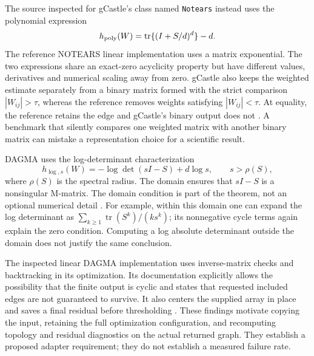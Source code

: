 The source inspected for gCastle's class named \texttt{Notears} instead uses
the polynomial expression
\begin{equation}
 h_{\rm poly}(W)=\operatorname{tr}\{(I+S/d)^d\}-d.
\end{equation}
The reference NOTEARS linear implementation uses a matrix exponential. The
two expressions share an exact-zero acyclicity property but have different
values, derivatives and numerical scaling away from zero. gCastle also keeps
the weighted estimate separately from a binary matrix formed with the strict
comparison \(|W_{ij}|>\tau\), whereas the reference removes weights satisfying
\(|W_{ij}|<\tau\). At equality, the reference retains the edge and gCastle's
binary output does not \citep{exec13_pydisc_gcastle,exec13_pydisc_notears}.
A benchmark that silently compares one weighted matrix with another binary
matrix can mistake a representation choice for a scientific result.

DAGMA uses the log-determinant characterization
\begin{equation}
 h_{\log,s}(W)=-\log\det(sI-S)+d\log s,
 \qquad s>\rho(S),
\end{equation}
where \(\rho(S)\) is the spectral radius. The domain ensures that \(sI-S\) is
a nonsingular M-matrix. The domain condition is part of the theorem, not an
optional numerical detail \citep{exec13_pydisc_dagma2022}. For example, within
this domain one can expand the log determinant as
\(\sum_{k\geq1}\operatorname{tr}(S^k)/(k s^k)\); its nonnegative cycle terms
again explain the zero condition. Computing a log absolute determinant outside
the domain does not justify the same conclusion.

The inspected linear DAGMA implementation uses inverse-matrix checks and
backtracking in its optimization. Its documentation explicitly allows the
possibility that the finite output is cyclic and states that requested included
edges are not guaranteed to survive. It also centers the supplied array in
place and saves a final residual before thresholding
\citep{exec13_pydisc_dagma}. These findings motivate copying the input,
retaining the full optimization configuration, and recomputing topology and
residual diagnostics on the actual returned graph. They establish a proposed
adapter requirement; they do not establish a measured failure rate.

